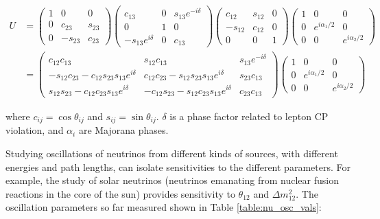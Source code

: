 \begin{equation}
\begin{aligned}
U &= \begin{pmatrix}
1 & 0 & 0 \\
0 & c_{23} & s_{23} \\
0 & -s_{23} & c_{23} \end{pmatrix}
\begin{pmatrix}
c_{13} & 0 & s_{13} e^{-i \delta} \\
0 & 1 & 0 \\
-s_{13} e^{i \delta} & 0 & c_{13} \end{pmatrix}
\begin{pmatrix}
c_{12} & s_{12} & 0 \\
-s_{12} & c_{12} & 0 \\
0 & 0 & 1 \end{pmatrix}
\begin{pmatrix}
1 & 0 & 0 \\
0 & e^{i \alpha_{1}/2} & 0 \\
0 & 0 & e^{i \alpha_{2}/2} \end{pmatrix} \\
& = \begin{pmatrix}
c_{12} c_{13} & s_{12} c_{13} & s_{13} e^{-i \delta} \\
-s_{12} c_{23} - c_{12} s_{23} s_{13} e^{i \delta} & c_{12} c_{23} - s_{12} s_{23} s_{13} e^{i \delta} & s_{23} c_{13} \\
s_{12} s_{23} - c_{12} c_{23} s_{13} e^{i \delta} & -c_{12} s_{23} - s_{12} c_{23} s_{13} e^{i \delta} & c_{23} c_{13} \end{pmatrix}
\begin{pmatrix}
1 & 0 & 0 \\
0 & e^{i \alpha_{1}/2} & 0 \\
0 & 0 & e^{i \alpha_{2}/2} \end{pmatrix}
\end{aligned}
\label{eqn:umatrix}
\end{equation}

\noindent
where $c_{ij} = \cos \theta_{ij}$ and $s_{ij} = \sin \theta_{ij}$.  $\delta$ is a phase factor related to lepton CP violation, and $\alpha_{i}$ are Majorana phases.

Studying oscillations of neutrinos from different kinds of sources, with different energies and path lengths, can isolate sensitivities to the different parameters.  For example, the study of solar neutrinos (neutrinos emanating from nuclear fusion reactions in the core of the sun) provides sensitivity to $\theta_{12}$ and $\Delta m_{12}^{2}$.  The oscillation parameters so far measured shown in Table  \ref{table:nu_osc_vals}:


